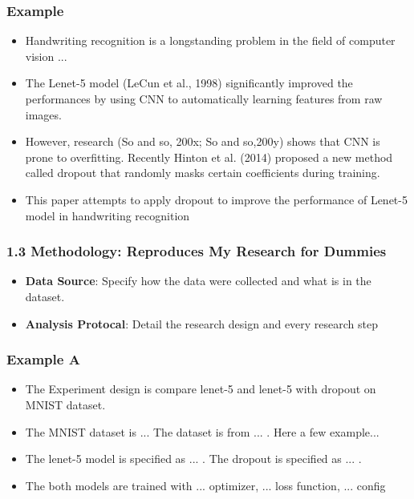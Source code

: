 \documentclass{beamer}
\begin{document}
    \begin{frame}
    \frametitle{Example}
    \begin{itemize}
        \item Handwriting recognition is a longstanding problem in the field of computer vision ...
        \item The Lenet-5 model (LeCun et al., 1998) significantly improved the performances by using CNN to automatically learning features from raw images.
        \item However, research (So and so, 200x; So and so,200y) shows that CNN is prone to overfitting. Recently Hinton et al. (2014) proposed a new method called dropout that randomly masks certain coefficients during training.
        \item This paper attempts to apply dropout to improve the performance of Lenet-5 model in handwriting recognition
    \end{itemize}
    \end{frame}
    
    
    
    \begin{frame}
    \frametitle{1.3 Methodology: Reproduces My Research for Dummies}
    \begin{itemize}
        \item \textbf{Data Source}: Specify how the data were collected and what is in the dataset.
        \item \textbf{Analysis Protocal}: Detail the research design and every research step
    \end{itemize}
    \end{frame}
    
    
    \begin{frame}
        \frametitle{Example A}
        \begin{itemize}
            \item The Experiment design is compare lenet-5 and lenet-5 with dropout on MNIST dataset.
            \item The MNIST dataset is ...  The dataset is from ... . Here a few example...
            \item The lenet-5 model is specified as ... . The dropout is specified as ... .
            \item The both models are trained with ... optimizer, ... loss function, ... config
        \end{itemize}
        \end{frame}
        
\end{document}
